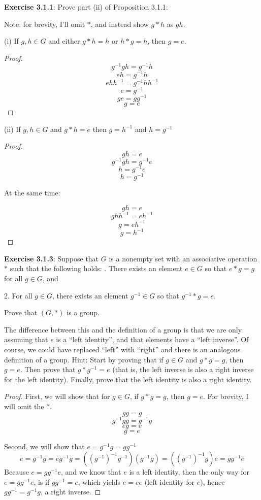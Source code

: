 \documentclass[a4paper]{article}
\begin{document}
\begin{myparindent}{0pt}
\textbf{Exercise 3.1.1}:
Prove part (ii) of Proposition 3.1.1: \newline

Note: for brevity, I'll omit $*$, and instead show $g * h$ as $gh$.

(i) If $g, h \in G$ and either $g * h = h$ or $h * g = h$, then $g = e$.
\begin{proof}
  \[ g^{-1}gh = g^{-1}h \]
  \[ eh = g^{-1}h \]
  \[ ehh^{-1} = g^{-1}hh^{-1} \]
  \[ e = g^{-1} \]
  \[ ge = gg^{-1} \]
  \[ g = e \]
\end{proof}

(ii) If $g, h \in G$ and $g * h = e$ then $g = h^{-1}$ and $h = g^{-1}$
\begin{proof}
  \[ gh = e \]
  \[ g^{-1}gh = g^{-1}e \]
  \[ h = g^{-1}e \]
  \[ h = g^{-1} \]

  At the same time:

  \[ gh = e \]
  \[ ghh^{-1} = eh^{-1} \]
  \[ g = eh^{-1} \]
  \[ g = h^{-1} \]
\end{proof}

\textbf{Exercise 3.1.3}:
Suppose that $G$ is a nonempty set with an associative operation $*$ such that
the following holds: . There exists an element $e \in G$ so that $e * g = g$ for all $g \in G$, and

2. For all $g \in G$, there exists an element $g^{-1} \in G$ so that
$g^{-1} * g = e$.

Prove that $(G, *)$ is a group. \newline

The difference between this and the definition of a group is that we are only
assuming that $e$ is a “left identity”, and that elements have a “left inverse”.
Of course, we could have replaced “left” with “right” and there is an analogous
definition of a group. Hint: Start by proving that if $g \in G$ and
$g * g = g$, then $g = e$. Then prove that $g * g^{-1} = e$ (that is, the left
inverse is also a right inverse for the left identity). Finally, prove that the
left identity is also a right identity. \newline

\begin{proof}
  First, we will show that for $g \in G$, if $g * g = g$, then $g = e$. For
  brevity, I will omit the $*$.
  \[ gg = g \]
  \[ g^{-1}gg = g^{-1} g \]
  \[ eg = e \]
  \[ g = e \]

  Second, we will show that $e = g^{-1}g = gg^{-1}$
  \[ e = g^{-1}g = eg^{-1}g = (({g^{-1}})^{-1}g^{-1}) (g^{-1}g) = (({g^{-1}})^{-1}g) e = gg^{-1}e \]
  Because $e = gg^{-1}e$, and we know that $e$ is a left identity, then the only
  way for $e = gg^{-1}e$, is if $gg^{-1} = e$, which yields $e = ee$ (left identity for $e$), hence $gg^{-1} = g^{-1}g$,
  a right inverse. \newline


\end{proof}
\end{myparindent}
\end{document}
